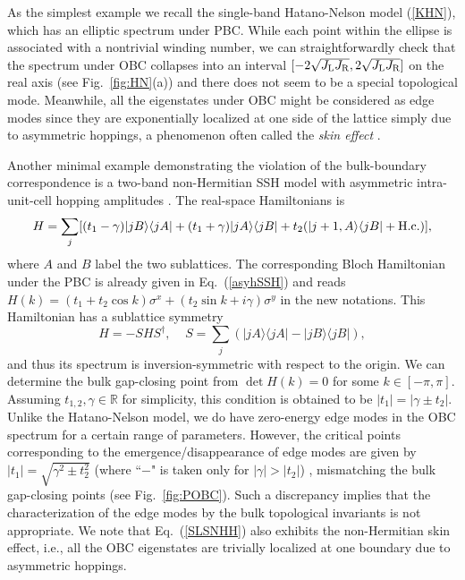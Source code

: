 \documentclass{tADP2e}
\theoremstyle{plain}
\theoremstyle{plain}
\theoremstyle{definition}
\begin{document}
As the simplest example 
we recall the single-band Hatano-Nelson model 
(\ref{KHN}), which has an elliptic spectrum under  PBC. While each point within the ellipse is associated with a nontrivial winding number, we can straightforwardly check that the spectrum under OBC collapses into an interval $[-2\sqrt{J_{\rm L}J_{\rm R}},2\sqrt{J_{\rm L}J_{\rm R}}]$ on the real axis (see Fig.~\ref{fig:HN}(a)) and there does not seem to be a special topological mode. Meanwhile, all the eigenstates under OBC might be considered as edge modes since they are exponentially localized at one side of the lattice simply due to asymmetric hoppings, a phenomenon often called the \emph{skin effect} \cite{YS18a}.




Another minimal example demonstrating the violation of the bulk-boundary correspondence is a two-band 
non-Hermitian SSH model with asymmetric intra-unit-cell hopping amplitudes \cite{LTE16,YS18a,JL19}. The real-space Hamiltonians is
\begin{equation}
H=\sum_j[(t_1-\gamma)|jB\rangle\langle jA|+(t_1+\gamma)|jA\rangle\langle jB|+t_2(|j+1,A\rangle\langle jB|+{\rm H.c.})],
\label{SLSNHH}
\end{equation}
where $A$ and $B$ label the two sublattices. The corresponding Bloch Hamiltonian under the PBC is already given in Eq.~(\ref{asyhSSH}) and reads $H(k)=(t_1+t_2\cos k)\sigma^x+(t_2\sin k+i\gamma)\sigma^y$ in the new notations. This Hamiltonian has a sublattice symmetry 
\begin{equation}
H=-SHS^\dag,\;\;\;\;S=\sum_j(|jA\rangle\langle jA|-|jB\rangle\langle jB|), 
\end{equation}
and thus its spectrum is inversion-symmetric with respect to the origin. We can determine the bulk gap-closing point from $\det H(k)=0$ for some $k\in[-\pi,\pi]$. Assuming $t_{1,2},\gamma\in\mathbb{R}$ for simplicity, this condition is obtained to be $|t_1|=|\gamma\pm t_2|$. Unlike the Hatano-Nelson model, we {do} have zero-energy edge modes in the OBC spectrum for a certain range of parameters. However, the critical points corresponding to the emergence/disappearance of edge modes are given by $|t_1|=\sqrt{\gamma^2\pm t_2^2}$ (where ``$-$" is taken only for $|\gamma|>|t_2|$) \cite{YS18a,KFK18}, mismatching the bulk gap-closing points (see Fig.~\ref{fig:POBC}). Such a discrepancy implies that the characterization of the edge modes by the bulk topological invariants is not appropriate. We note that Eq.~(\ref{SLSNHH}) also exhibits the non-Hermitian skin effect, i.e., all the OBC eigenstates  
are trivially localized at one boundary due to asymmetric hoppings.
\end{document}
